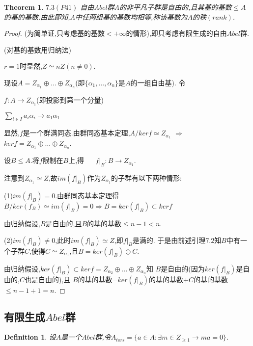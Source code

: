 \documentclass[UTF8]{article}
\newtheorem{thm}{Theorem}[section]
\newtheorem{defn}{Definition}[section]
\begin{document}
\begin{thm}
	\textbf{$7.3(P41)$}  自由$Abel$群$A$的非平凡子群是自由的,且其基的基数$\leq A$的基的基数.由此即知,$A$中任两组基的基数均相等,称该基数为$A$的秩$(rank)$.
\end{thm}
\begin{proof}
	(为简单证,只考虑基的基数$<+\infty$的情形),即只考虑有限生成的自由$Abel$群.
	
	(对基的基数用归纳法)
	
	$r=1$时显然,$Z\simeq nZ(n\neq 0)$.
	
	现设$A=Z_{\alpha_1}\oplus\dots\oplus Z_{\alpha_n}$(即$\{\alpha_1,\dots,\alpha_n\}$是$A$的一组自由基).
	令
	\begin{center}
		$f:A\rightarrow Z_{\alpha_1}$(即投影到第一个分量)
		
		$\sum\limits_{i\in I} a_i\alpha_i\rightarrow a_1\alpha_1$
	\end{center}
	
	显然,$f$是一个群满同态.由群同态基本定理,$A/kerf\simeq Z_{\alpha_1}$
	$\Rightarrow$  $kerf=Z_{\alpha_1}\oplus\dots\oplus Z_{\alpha_n}$.
	
	设$B\leq A$.将$f$限制在$B$上,得  $\quad$  $f|_B:B\rightarrow Z_{\alpha_1}$.
	
	注意到$Z_{\alpha_1}\simeq Z$,故$im(f|_B)$作为$Z_{\alpha_1}$的子群有以下两种情形:
	
	(1)$im(f|_B)=0$.由群同态基本定理得
	$B/ker(f_B)\simeq im(f|_B)=0\Rightarrow B=ker(f|_B)\subset kerf$
	
	由归纳假设,$B$是自由的,且$B$的基的基数$\leq n-1<n$.
	
	(2)$im(f|_B)\neq 0$,此时$im(f|_B)\simeq Z$,即$f|_B$是满的.
	于是由前述引理$7.2$知$B$中有一个子群$C$,使得$C\simeq Z_{\alpha_1}$,且$B=ker(f|_B)\oplus C$.
	
	由归纳假设,$ker(f|_B)\subset kerf=Z_{\alpha_2}\oplus\dots\oplus Z_{\alpha_n}$知
	$B$是自由的(因为$ker(f|_B)$是自由的,$C$也是自由的),且
	$B$的基的基数=$ker(f|_B)$的基的基数+$C$的基的基数$\leq n-1+1=n$.
	
	
\end{proof}

\subsection{有限生成$Abel$群}
\normalsize
\begin{defn}
	设$A$是一个$Abel$群,令$A_{tors}=\{a\in A:\exists m\in Z_{\geq 1}\rightarrow ma=0\}$.
\end{defn}
\end{document}
